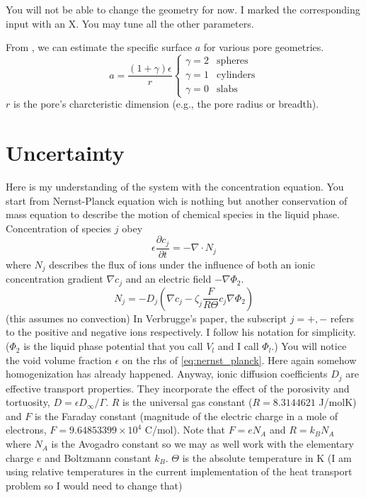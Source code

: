 \documentclass[10pt, oneside]{article}   	%
\begin{document}
You will not be able to change the geometry for now. I marked the corresponding
input with an X. 
You may tune all the other parameters.



From \cite{Verbrugge2005}, we can estimate the specific surface $a$ for various
pore geometries.
\begin{equation}
    a = \frac{(1+\gamma)\epsilon}{r}
    \left\{
    \begin{array}{ll}
    \gamma=2 & \text{spheres}   \\
    \gamma=1 & \text{cylinders} \\
    \gamma=0 & \text{slabs}
    \end{array}
    \right.
\end{equation}
$r$ is the pore's charcteristic dimension (e.g., the pore radius or breadth).




\newpage
\section{Uncertainty}

Here is my understanding of the system with the concentration equation.
You start from Nernst-Planck equation wich is nothing but another conservation
of mass equation to describe the motion of chemical species in the liquid
phase.
Concentration of species $j$ obey
\begin{equation}
\epsilon \frac{\partial c_j}{\partial t} = - \nabla \cdot N_j
\label{eq:nernst_planck}
\end{equation}
where $N_j$ describes the flux of ions under the influence of both an ionic
concentration gradient $\nabla c_j$ and an electric field $-\nabla \Phi_2$.
\begin{equation}
N_j = -D_j (\nabla c_j - \zeta_j \frac{F}{R\Theta} c_j \nabla \Phi_2)
\end{equation}
(this assumes no convection)
In Verbrugge's paper, the subscript $j=+,-$ refers to the positive and
negative ions respectively.  I follow his notation for simplicity.
($\Phi_2$ is the liquid phase potential that you call $V_l$ and I call $\Phi_l$.)
You will notice the void volume fraction $\epsilon$ on the rhs of
\eqref{eq:nernst_planck}.  Here again somehow homogenization has already
happened.  Anyway, ionic diffusion coefficients $D_j$ are effective transport
properties.  They incorporate the effect of the porosivity and tortuosity, 
$D = \epsilon D_\infty / \Gamma$.
$R$ is the universal gas constant ($R=8.3144621$ J/molK) and $F$ is the
Faraday constant (magnitude of the electric charge in a mole of electrons,
$F=9.64853399\times10^4$ C/mol).
Note that $F=e N_A$ and $R=k_B N_A$ where $N_A$ is the Avogadro constant so we
may as well work with the elementary charge $e$ and Boltzmann constant $k_B$.
$\Theta$ is the absolute temperature in K 
(I am using relative temperatures in the current implementation of the heat
transport problem so I would need to change that)
\end{document}

